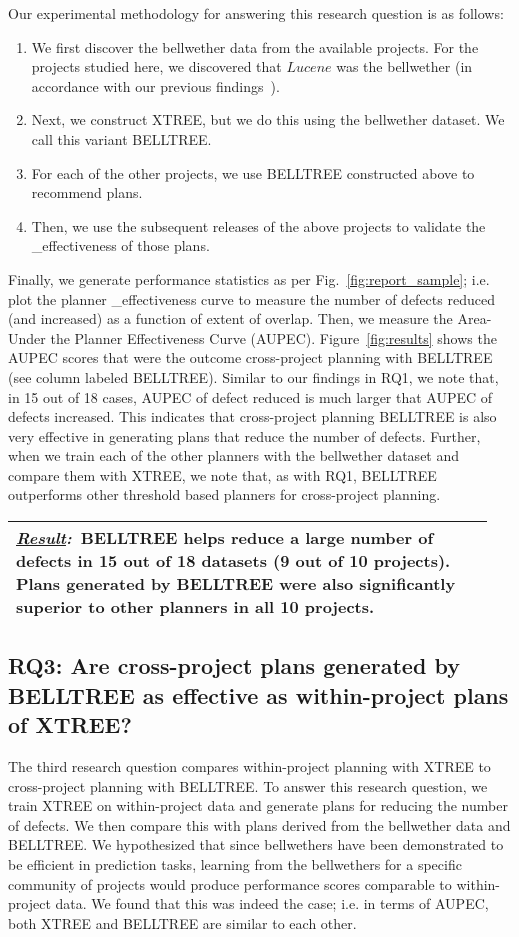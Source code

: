\documentclass[10pt, journal, compsoc]{IEEEtran}
\newcommand{\result}[1]{
\vspace{0.2cm}
\noindent\begin{minipage}{\linewidth}
\begin{tabular}{|p{0.95\linewidth}|}
\hline\vspace{-0.2cm}
\textbf{\textit{\underline{Result}:}}~#1\\\hline
\end{tabular}
\end{minipage}\bigstrut
}
\newcommand{\be}{\begin{enumerate}}
\newcommand{\ee}{\end{enumerate}}
\newcommand{\fig}[1]{Fig.~\ref{fig:#1}}
\begin{document}
Our experimental methodology for answering this research question is as follows:
\be
  \item We first discover the bellwether data from the available projects. For the projects studied here, we discovered that $Lucene$ was the bellwether (in accordance with our previous findings~\cite{krishna16, krishna17b}).
  \item Next, we construct XTREE, but we do this using the bellwether dataset. We call this variant BELLTREE.
  \item For each of the other projects, we use BELLTREE constructed above to recommend plans.
  \item Then, we use the subsequent releases of the above projects to validate the _effectiveness of those plans.
\ee

Finally, we generate performance statistics as per \fig{report_sample}; i.e. plot the planner _effectiveness curve to measure the number of defects reduced (and increased) as a function of extent of overlap. Then, we measure the Area-Under the Planner Effectiveness Curve (AUPEC). Figure~\ref{fig:results}\protect{} shows the AUPEC scores that were the outcome cross-project planning with BELLTREE (see column labeled BELLTREE). Similar to our findings in RQ1, we note that, in 15 out of 18 cases, AUPEC of defect reduced is much larger that AUPEC of defects increased. This indicates that cross-project planning BELLTREE is also very effective in generating plans that reduce the number of defects. Further, when we train each of the other planners with the bellwether dataset and compare them with XTREE, we note that, as with RQ1, BELLTREE outperforms other threshold based planners for cross-project planning.

\result{BELLTREE helps reduce a large number of defects in 15 out of 18 datasets (9 out of 10 projects). Plans generated by BELLTREE were also significantly superior to other planners in all 10 projects.}

\subsection*{{\bf RQ3: Are cross-project plans generated by BELLTREE as effective as within-project plans of XTREE?}}

The third research question compares within-project planning with XTREE to cross-project planning with BELLTREE. To answer this research question, we train XTREE on within-project data and generate plans for reducing the number of defects. We then compare this with plans derived from the bellwether data and BELLTREE. We hypothesized that since bellwethers have been demonstrated to be efficient in prediction tasks, learning from the bellwethers for a specific community of projects would produce performance scores comparable to within-project data. We found that this was indeed the case; i.e. in terms of AUPEC, both XTREE and BELLTREE are similar to each other.
\end{document}
